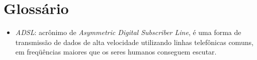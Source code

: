 \chapter*{Glossário} %
\label{cha:glossario}

\begin{itemize}

  \item \emph{ADSL}: acrônimo de \emph{Asymmetric Digital Subscriber Line}, é uma forma de transmissão de dados de alta velocidade utilizando linhas telefônicas comuns, em freqüências maiores que os seres humanos conseguem escutar.

\end{itemize}


